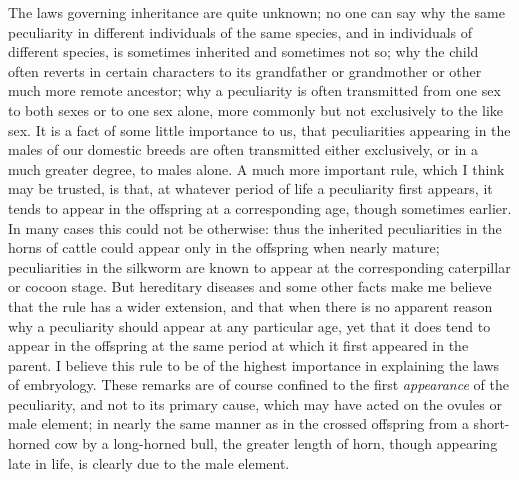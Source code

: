 \documentclass{book}
\begin{document}
The laws governing inheritance are quite unknown; no one can say why the same
peculiarity in different individuals of the same species, and in individuals of
different species, is sometimes inherited and sometimes not so; why the child
often reverts in certain characters to its grandfather or grandmother or other
much more remote ancestor; why a peculiarity is often transmitted from one sex
to both sexes or to one sex alone, more commonly but not exclusively to the
like sex. It is a fact of some little importance to us, that peculiarities
appearing in the males of our domestic breeds are often transmitted either
exclusively, or in a much greater degree, to males alone. A much more important
rule, which I think may be trusted, is that, at whatever period of life a
peculiarity first appears, it tends to appear in the offspring at a
corresponding age, though sometimes earlier. In many cases this could
not be otherwise: thus the inherited peculiarities in the horns of cattle could
appear only in the offspring when nearly mature; peculiarities in the silkworm
are known to appear at the corresponding caterpillar or cocoon stage. But
hereditary diseases and some other facts make me believe that the rule has a
wider extension, and that when there is no apparent reason why a peculiarity
should appear at any particular age, yet that it does tend to appear in the
offspring at the same period at which it first appeared in the parent. I
believe this rule to be of the highest importance in explaining the laws of
embryology. These remarks are of course confined to the first \emph{appearance}
of the peculiarity, and not to its primary cause, which may have acted on the
ovules or male element; in nearly the same manner as in the crossed offspring
from a short-horned cow by a long-horned bull, the greater length of horn,
though appearing late in life, is clearly due to the male element.
\end{document}
